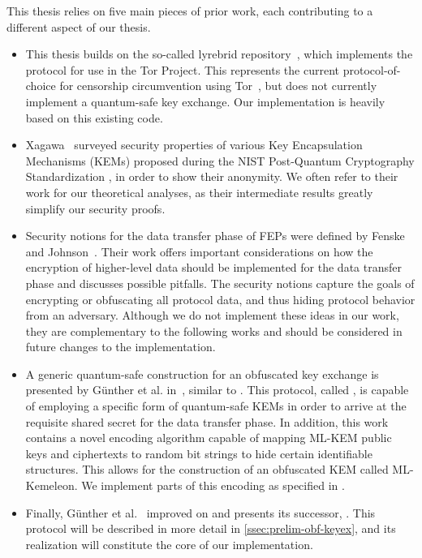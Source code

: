 This thesis relies on five main pieces of prior work, each contributing to a different aspect of our thesis.
\begin{itemize}
    \item This thesis builds on the so-called lyrebrid repository~\cite{lyrebird}, which implements the \obfsfour{} protocol for use in the Tor Project. This represents the current protocol-of-choice for censorship circumvention using Tor~\cite{tor-pt-recommendations,tor-bridge-setup}, but does not currently implement a quantum-safe key exchange. Our implementation is heavily based on this existing code.

    \item Xagawa~\cite{EC:Xagawa22} surveyed security properties of various Key Encapsulation Mechanisms (KEMs) proposed during the NIST Post-Quantum Cryptography Standardization \cite{nist-standardization}, in order to show their anonymity. We often refer to their work for our theoretical analyses, as their intermediate results greatly simplify our security proofs.

    \item Security notions for the data transfer phase of FEPs were defined by Fenske and Johnson~\cite{CCS:FenJoh24}. Their work offers important considerations on how the encryption of higher-level data should be implemented for the data transfer phase and discusses possible pitfalls. The security notions capture the goals of encrypting or obfuscating all protocol data, and thus hiding protocol behavior from an adversary.
    Although we do not implement these ideas in our work, they are complementary to the following works and should be considered in future changes to the implementation.

    \item A generic quantum-safe construction for an obfuscated key exchange is presented by Günther et al. in~\cite{CCS:GunSteVei24}, similar to \obfsfour{}. This protocol, called \pqobfs{}, is capable of employing a specific form of quantum-safe KEMs in order to arrive at the requisite shared secret for the data transfer phase.
    In addition, this work contains a novel encoding algorithm capable of mapping ML-KEM public keys and ciphertexts to random bit strings to hide certain identifiable structures. This allows for the construction of an obfuscated KEM called ML-Kemeleon. We implement parts of this encoding as specified in \cite{irtf-cfrg-kemeleon-00}. 

    \item Finally, Günther et al.~\cite{EPRINT:GRSV25} improved on \pqobfs{} and presents its successor, \drivel{}. This protocol will be described in more detail in \cref{ssec:prelim-obf-keyex}, and its realization will constitute the core of our implementation.
\end{itemize}
